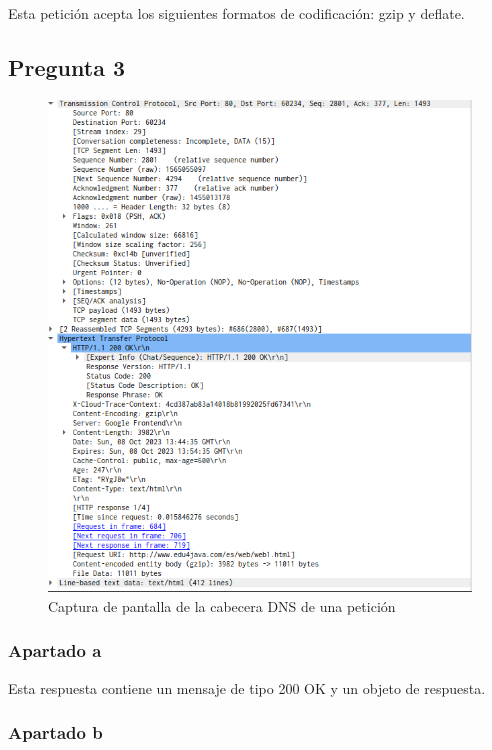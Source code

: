 \documentclass[spanish]{report} %
\begin{document}
Esta petición acepta los siguientes formatos de codificación: gzip y deflate.
\subsection{Pregunta 3}

\begin{figure}[h]
\begin{center}
\includegraphics[scale=.35]{../img/10.png}
\end{center}
\caption{Captura de pantalla de la cabecera DNS de una petición}
\end{figure}


\subsubsection{Apartado a}

Esta respuesta contiene un mensaje de tipo 200 OK y un objeto de respuesta.

\subsubsection{Apartado b}
\end{document}
